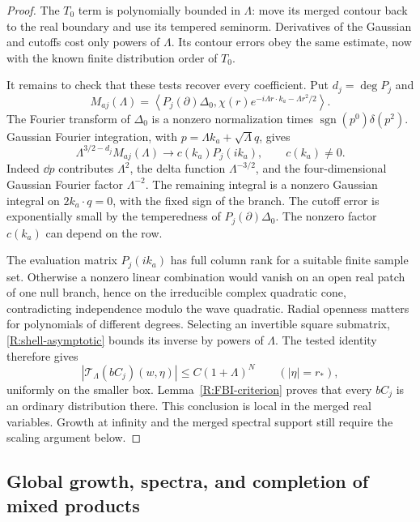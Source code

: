 \begin{proof}
The $T_0$ term is polynomially bounded in $\Lambda$: move its merged
contour back to the real boundary and use its tempered seminorm.
Derivatives of the Gaussian and cutoffs cost only powers of
$\Lambda$.  Its contour errors obey the same estimate, now with the
known finite distribution order of $T_0$.

It remains to check that these tests recover every coefficient.  Put
$d_j=\deg P_j$ and
\[
 M_{aj}(\Lambda)=
  \left\langle P_j(\partial)\Delta_0,
       \chi(r)e^{-i\Lambda r\cdot k_a-\Lambda r^2/2}\right\rangle.
\]
The Fourier transform of $\Delta_0$ is a nonzero normalization times
$\operatorname{sgn}(p^0)\delta(p^2)$.  Gaussian Fourier integration,
with $p=\Lambda k_a+\sqrt\Lambda q$, gives
\begin{equation}\label{R:shell-asymptotic}
 \Lambda^{3/2-d_j}M_{aj}(\Lambda)
       \longrightarrow c(k_a)P_j(ik_a),\qquad c(k_a)\ne0.
\end{equation}
Indeed $\dd p$ contributes $\Lambda^2$, the delta function
$\Lambda^{-3/2}$, and the four-dimensional Gaussian Fourier factor
$\Lambda^{-2}$.  The remaining integral is a nonzero Gaussian
integral on $2k_a\cdot q=0$, with the fixed sign of the branch.
The cutoff error is exponentially small by the temperedness of
$P_j(\partial)\Delta_0$.  The nonzero factor $c(k_a)$ can depend on
the row.

The evaluation matrix $P_j(ik_a)$ has full column rank for a suitable
finite sample set.  Otherwise a nonzero linear combination would
vanish on an open real patch of one null branch, hence on the
irreducible complex quadratic cone, contradicting independence
modulo the wave quadratic.  Radial openness matters for polynomials
of different degrees.  Selecting an invertible square submatrix,
\eqref{R:shell-asymptotic} bounds its inverse by powers of $\Lambda$.
The tested identity therefore gives
\[
 |\mathcal T_\Lambda(bC_j)(w,\eta)|\leq C(1+\Lambda)^N
      \qquad(|\eta|=r_*),
\]
uniformly on the smaller box.  Lemma~\ref{R:FBI-criterion} proves
that every $bC_j$ is an ordinary distribution there.
This conclusion is local in the merged real variables.  Growth at
infinity and the merged spectral support still require the scaling
argument below.
\end{proof}

\subsection{Global growth, spectra, and completion of mixed products}

